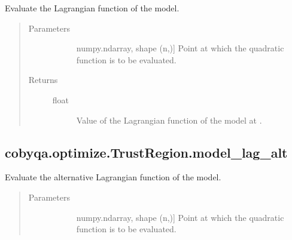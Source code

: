 \documentclass[letterpaper,10pt,english]{sphinxmanual}
\begin{document}
\begin{fulllineitems}
\begin{fulllineitems}
\label{\detokenize{refs/generated/cobyqa.optimize.TrustRegion.model_lag:cobyqa.optimize.TrustRegion.model_lag}}
\sphinxAtStartPar
Evaluate the Lagrangian function of the model.
\begin{quote}\begin{description}
\item[{Parameters}] \leavevmode\begin{description}
\item[{}] \leavevmode{[}numpy.ndarray, shape (n,){]}
\sphinxAtStartPar
Point at which the quadratic function is to be evaluated.

\end{description}

\item[{Returns}] \leavevmode\begin{description}
\item[{float}] \leavevmode
\sphinxAtStartPar
Value of the Lagrangian function of the model at .

\end{description}

\end{description}\end{quote}

\end{fulllineitems}



\subsection{cobyqa.optimize.TrustRegion.model\_lag\_alt}
\label{\detokenize{refs/generated/cobyqa.optimize.TrustRegion.model_lag_alt:cobyqa-optimize-trustregion-model-lag-alt}}\label{\detokenize{refs/generated/cobyqa.optimize.TrustRegion.model_lag_alt::doc}}

\begin{fulllineitems}
\label{\detokenize{refs/generated/cobyqa.optimize.TrustRegion.model_lag_alt:cobyqa.optimize.TrustRegion.model_lag_alt}}
\sphinxAtStartPar
Evaluate the alternative Lagrangian function of the model.
\begin{quote}\begin{description}
\item[{Parameters}] \leavevmode\begin{description}
\item[{}] \leavevmode{[}numpy.ndarray, shape (n,){]}
\sphinxAtStartPar
Point at which the quadratic function is to be evaluated.


\end{description}
\end{description}
\end{quote}
\end{fulllineitems}
\end{fulllineitems}
\end{document}
